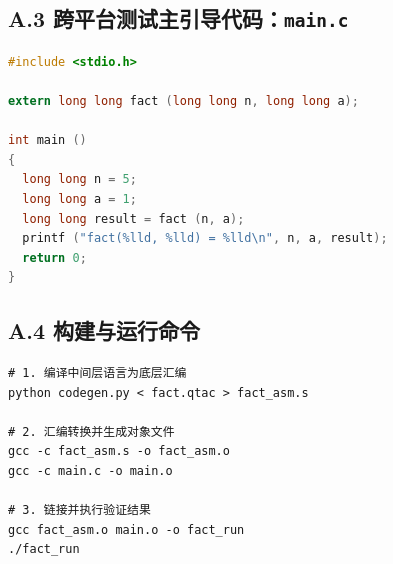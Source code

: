 \documentclass[12pt,a4paper]{ctexart}
\begin{document}
\subsection*{A.3 跨平台测试主引导代码：\texttt{main.c}}
\begin{lstlisting}[language=C]
#include <stdio.h>

extern long long fact (long long n, long long a);

int main ()
{
  long long n = 5;
  long long a = 1;
  long long result = fact (n, a);
  printf ("fact(%lld, %lld) = %lld\n", n, a, result);
  return 0;
}
\end{lstlisting}

\subsection*{A.4 构建与运行命令}
\begin{verbatim}
# 1. 编译中间层语言为底层汇编
python codegen.py < fact.qtac > fact_asm.s

# 2. 汇编转换并生成对象文件
gcc -c fact_asm.s -o fact_asm.o
gcc -c main.c -o main.o

# 3. 链接并执行验证结果
gcc fact_asm.o main.o -o fact_run
./fact_run
\end{verbatim}
\end{document}
